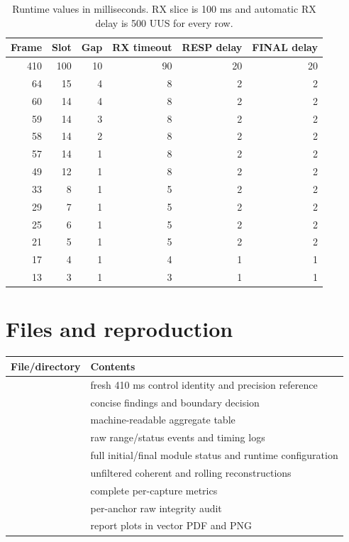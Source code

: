 \documentclass[11pt,a4paper]{article}
\begin{document}
\begin{table}[H]
  \centering
  \small
  \begin{tabular}{rrrrrr}
    \toprule
    Frame & Slot & Gap & RX timeout & RESP delay & FINAL delay\\
    \midrule
    410 & 100 & 10 & 90 & 20 & 20\\
    64 & 15 & 4 & 8 & 2 & 2\\
    60 & 14 & 4 & 8 & 2 & 2\\
    59 & 14 & 3 & 8 & 2 & 2\\
    58 & 14 & 2 & 8 & 2 & 2\\
    57 & 14 & 1 & 8 & 2 & 2\\
    49 & 12 & 1 & 8 & 2 & 2\\
    33 & 8 & 1 & 5 & 2 & 2\\
    29 & 7 & 1 & 5 & 2 & 2\\
    25 & 6 & 1 & 5 & 2 & 2\\
    21 & 5 & 1 & 5 & 2 & 2\\
    17 & 4 & 1 & 4 & 1 & 1\\
    13 & 3 & 1 & 3 & 1 & 1\\
    \bottomrule
  \end{tabular}
  \caption{Runtime values in milliseconds. RX slice is 100 ms and automatic
  RX delay is 500 UUS for every row.}
\end{table}

\section{Files and reproduction}

\small
\begin{tabularx}{\textwidth}{p{62mm}Y}
  \toprule
  File/directory & Contents\\
  \midrule
   & fresh 410 ms control identity and precision reference\\
   & concise findings and boundary decision\\
   & machine-readable aggregate table\\
   & raw range/status events and timing logs\\
   & full initial/final module status and runtime
  configuration\\
   & unfiltered coherent and rolling reconstructions\\
   & complete per-capture metrics\\
   & per-anchor raw integrity audit\\
   & report plots in vector PDF and PNG\\
  \bottomrule
\end{tabularx}
\end{document}
